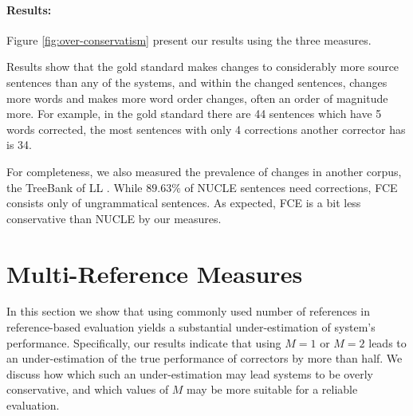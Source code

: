 		\paragraph{Results:}
		Figure \ref{fig:over-conservatism} present our results using the three measures. %
		
		Results show that the gold standard makes changes to considerably more source sentences than any of the systems, and within the changed sentences, changes more words and makes more word order changes, often an order of magnitude more. For example, in the gold standard there are 44 sentences which have 5 words corrected, the most sentences with only 4 corrections another corrector has is 34.
		
		For completeness, we also measured the prevalence of changes in
		another corpus, the TreeBank of LL \cite[FCE]{yannakoudakis2011new}.
		While $89.63\%$ of NUCLE sentences need corrections, FCE consists only of ungrammatical sentences. As expected, FCE is a bit less conservative than NUCLE by our measures.
		
		
		\section{Multi-Reference Measures}\label{sec:increase-reference}
		
		In this section we show that using commonly used number of references in reference-based evaluation yields a substantial under-estimation of system's performance. Specifically, our results indicate that using $M=1$ or $M=2$ leads to an under-estimation of the true performance of correctors by more than half.
		We discuss how which such an under-estimation may lead systems to be
		overly conservative, and which values of $M$ may be more suitable for
		a reliable evaluation.
		
		
